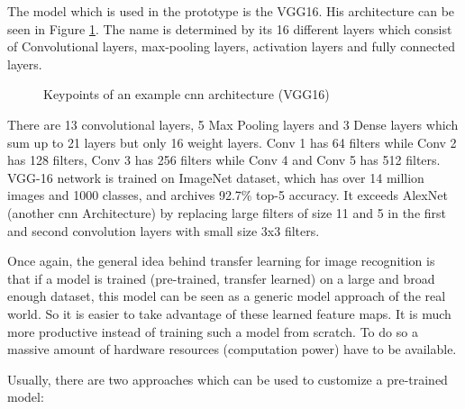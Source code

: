 The model which is used in the prototype is the VGG16. His architecture can be seen in Figure \ref{fig:vgg16}. The name is determined by its 16 different layers which consist of Convolutional layers, max-pooling layers, activation layers and fully connected layers. 

\begin{figure}[htp]
	\centering
	\caption{Keypoints of an example cnn architecture (VGG16)}
	\label{fig:vgg16}
\end{figure}

There are 13 convolutional layers, 5 Max Pooling layers and 3 Dense layers which sum up to 21 layers but only 16 weight layers.
Conv 1 has 64 filters while Conv 2 has 128 filters, Conv 3 has 256 filters while Conv 4 and Conv 5 has 512 filters.
VGG-16 network is trained on ImageNet dataset, which has over 14 million images and 1000 classes, and archives 92.7\% top-5 accuracy. It exceeds AlexNet (another \gls{cnn} Architecture) by replacing large filters of size 11 and 5 in the first and second convolution layers with small size 3x3 filters.

Once again, the general idea behind transfer learning for image recognition is that if a model is trained (pre-trained, transfer learned) on a large and broad enough dataset, this model can be seen as a generic model approach of the real world. So it is easier to take advantage of these learned feature maps. It is much more productive instead of training such a model from scratch. To do so a massive amount of hardware resources (computation power) have to be available. 

Usually, there are two approaches which can be used to customize a pre-trained model:

